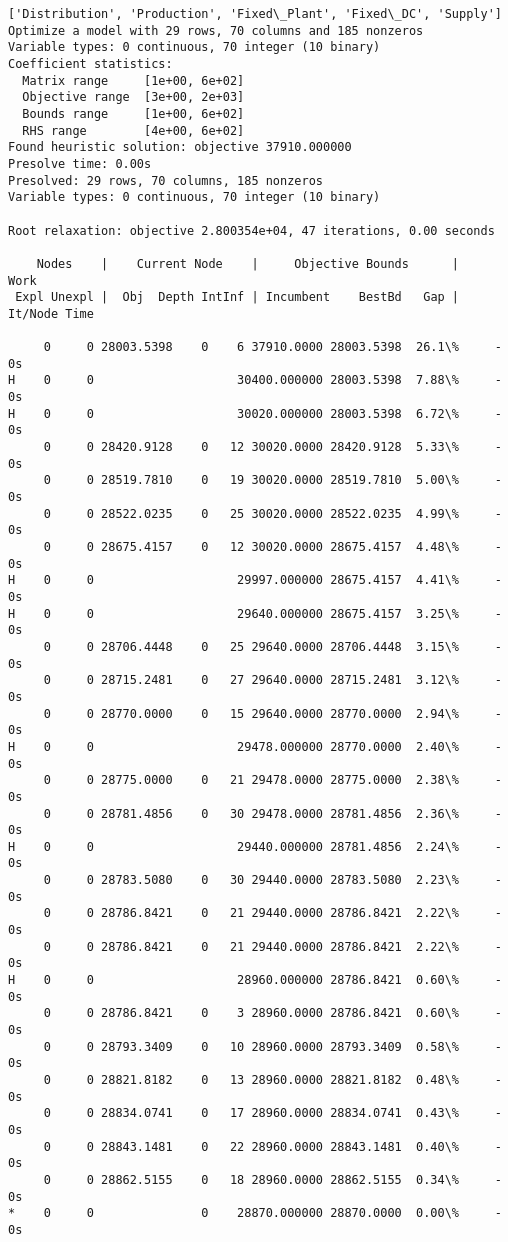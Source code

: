 \documentclass[11pt]{article}
\begin{document}
    \begin{Verbatim}[commandchars=\\\{\}]
['Distribution', 'Production', 'Fixed\_Plant', 'Fixed\_DC', 'Supply']
Optimize a model with 29 rows, 70 columns and 185 nonzeros
Variable types: 0 continuous, 70 integer (10 binary)
Coefficient statistics:
  Matrix range     [1e+00, 6e+02]
  Objective range  [3e+00, 2e+03]
  Bounds range     [1e+00, 6e+02]
  RHS range        [4e+00, 6e+02]
Found heuristic solution: objective 37910.000000
Presolve time: 0.00s
Presolved: 29 rows, 70 columns, 185 nonzeros
Variable types: 0 continuous, 70 integer (10 binary)

Root relaxation: objective 2.800354e+04, 47 iterations, 0.00 seconds

    Nodes    |    Current Node    |     Objective Bounds      |     Work
 Expl Unexpl |  Obj  Depth IntInf | Incumbent    BestBd   Gap | It/Node Time

     0     0 28003.5398    0    6 37910.0000 28003.5398  26.1\%     -    0s
H    0     0                    30400.000000 28003.5398  7.88\%     -    0s
H    0     0                    30020.000000 28003.5398  6.72\%     -    0s
     0     0 28420.9128    0   12 30020.0000 28420.9128  5.33\%     -    0s
     0     0 28519.7810    0   19 30020.0000 28519.7810  5.00\%     -    0s
     0     0 28522.0235    0   25 30020.0000 28522.0235  4.99\%     -    0s
     0     0 28675.4157    0   12 30020.0000 28675.4157  4.48\%     -    0s
H    0     0                    29997.000000 28675.4157  4.41\%     -    0s
H    0     0                    29640.000000 28675.4157  3.25\%     -    0s
     0     0 28706.4448    0   25 29640.0000 28706.4448  3.15\%     -    0s
     0     0 28715.2481    0   27 29640.0000 28715.2481  3.12\%     -    0s
     0     0 28770.0000    0   15 29640.0000 28770.0000  2.94\%     -    0s
H    0     0                    29478.000000 28770.0000  2.40\%     -    0s
     0     0 28775.0000    0   21 29478.0000 28775.0000  2.38\%     -    0s
     0     0 28781.4856    0   30 29478.0000 28781.4856  2.36\%     -    0s
H    0     0                    29440.000000 28781.4856  2.24\%     -    0s
     0     0 28783.5080    0   30 29440.0000 28783.5080  2.23\%     -    0s
     0     0 28786.8421    0   21 29440.0000 28786.8421  2.22\%     -    0s
     0     0 28786.8421    0   21 29440.0000 28786.8421  2.22\%     -    0s
H    0     0                    28960.000000 28786.8421  0.60\%     -    0s
     0     0 28786.8421    0    3 28960.0000 28786.8421  0.60\%     -    0s
     0     0 28793.3409    0   10 28960.0000 28793.3409  0.58\%     -    0s
     0     0 28821.8182    0   13 28960.0000 28821.8182  0.48\%     -    0s
     0     0 28834.0741    0   17 28960.0000 28834.0741  0.43\%     -    0s
     0     0 28843.1481    0   22 28960.0000 28843.1481  0.40\%     -    0s
     0     0 28862.5155    0   18 28960.0000 28862.5155  0.34\%     -    0s
*    0     0               0    28870.000000 28870.0000  0.00\%     -    0s


\end{Verbatim}
\end{document}
